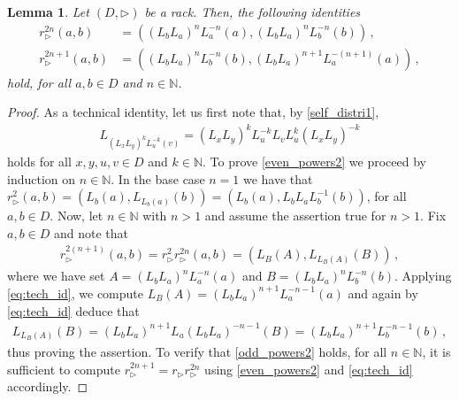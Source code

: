 \documentclass[preprint,1p]{elsarticle}
\numberwithin{equation}{section}
\newtheorem{lemma}[theor]{Lemma}
\theoremstyle{definition}               %
\newcommand{\tr}{\triangleright}
\begin{document}
\begin{lemma}\label{powers_prop}
    Let $(D,\triangleright)$ be a rack. Then, the following identities 
    \begin{align}
        r_\tr^{2n}(a,b) &= \left((L_bL_a)^nL_a^{-n}(a),(L_bL_a)^nL_b^{-n}(b)\right) \label{even_powers2}\,, \\[0.2cm]
        r_\tr^{2n+1}(a,b) &= \left((L_bL_a)^nL_b^{-n}(b),(L_bL_a)^{n+1}L_a^{-(n+1)}(a)\right) \label{odd_powers2}\,,
    \end{align}
    hold, for all $a,b \in D$ and $n\in\mathbb{N}$.
\end{lemma}
\begin{proof}
    As a technical identity, let us first note that, {by \eqref{self_distri1}},
    \begin{align}\label{eq:tech_id}
        L_{\left(L_xL_y\right)^kL_u^{-k}(v)} =
        \left(L_xL_y\right)^kL_u^{-k}L_vL_u^k\left(L_xL_y\right)^{-k}
    \end{align}
    holds for all $x,y,u,v \in D$ and $k \in \mathbb{N}$.
    To prove \eqref{even_powers2} we proceed by induction on $n \in \mathbb{N}$.
    In the base case $n = 1$ we have that 
    $r^2_\tr(a,b) = \left(L_b(a),L_{L_b(a)}(b)\right) = \left(L_b(a),L_bL_aL_b^{-1}(b)\right)$, for all $a,b \in D$.
    Now, let $n \in \mathbb{N}$ with $n > 1$ and assume the assertion true for $n > 1$.
    Fix $a,b \in D$ and note that
    \begin{align*}
        r_\tr^{2(n+1)}(a,b) 
            = 
            r_\tr^2 r_\tr^{2n}(a,b)
            =
            (L_B(A),L_{L_B(A)}(B)) \,,
    \end{align*}
    where we have set $A = (L_bL_a)^{n}L_a^{-n}(a)$ and $B = (L_bL_a)^{n}L_b^{-n}(b)$.
    Applying \eqref{eq:tech_id}, we compute $L_B(A) = \left(L_bL_a\right)^{n+1}L_a^{-n-1}(a)$ and again by \eqref{eq:tech_id} deduce that
    \begin{align*}
        L_{L_B(A)}(B) 
        = \left(L_bL_a\right)^{n+1}L_a\left(L_bL_a\right)^{-n-1}(B) 
        = \left(L_bL_a\right)^{n+1}L_b^{-n-1}(b) \,,
    \end{align*}
    thus proving the assertion.
    To verify that \eqref{odd_powers2} holds, for all $n \in \mathbb{N}$, it is sufficient to compute $r_\tr^{2n+1} = r^{}_\tr r_\tr^{2n}$ using \eqref{even_powers2} and \eqref{eq:tech_id} accordingly.
\end{proof}
\end{document}
